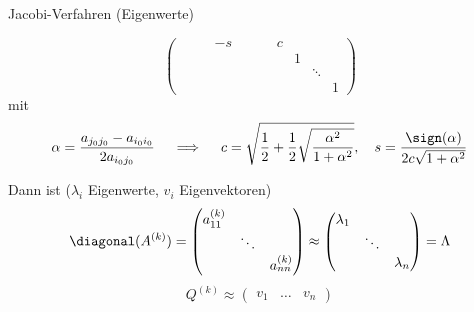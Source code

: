 \begin{defi}{Jacobi-Verfahren (Eigenwerte)}
\begin{enumerate}
\begin{itemize}
\[\begin{pmatrix}
                                  &        &   & -s &   &        &   & c &   &        &   \\
                                  &        &   &    &   &        &   &   & 1 &        &   \\
                                  &        &   &    &   &        &   &   &   & \ddots &   \\
                                  &        &   &    &   &        &   &   &   &        & 1
                            \end{pmatrix}
                        \]
                        mit
                        \[
                            \alpha = \frac{a_{j_0 j_0} - a_{i_0 i_0}}{2 a_{i_0 j_0}} \quad \implies \quad c = \sqrt{\frac{1}{2} + \frac{1}{2} \sqrt{\frac{\alpha^2}{1 + \alpha^2}}}, \quad s = \frac{\sign(\alpha)}{2c \sqrt{1 + \alpha^2}}
                        \]
              \end{itemize}
    \end{enumerate}

    Dann ist ($\lambda_i$ Eigenwerte, $v_i$ Eigenvektoren)
    \[
        \diagonal(A^{(k)}) =
        \begin{pmatrix}
            a_{11}^{(k)} &        &              \\
                         & \ddots &              \\
                         &        & a_{nn}^{(k)}
        \end{pmatrix}
        \approx
        \begin{pmatrix}
            \lambda_1 &        &           \\
                      & \ddots &           \\
                      &        & \lambda_n
        \end{pmatrix}
        = \Lambda
    \]
    \[
        Q^{(k)} \approx
        \begin{pmatrix}
            v_1 & \ldots & v_n
        \end{pmatrix}
    \]
\end{defi}

